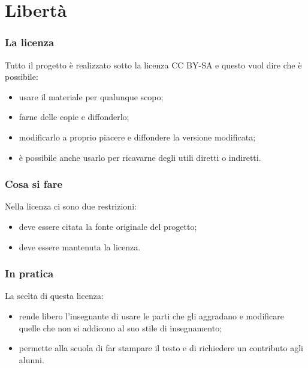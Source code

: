 \documentclass{beamer} %
\begin{document}
\section{Libertà}


\begin{frame}\frametitle{La licenza}

Tutto il progetto è realizzato sotto la licenza CC BY-SA e questo vuol dire 
che è possibile:
\begin{itemize} [<+->]
\item usare il materiale per qualunque scopo;
\item farne delle copie e diffonderlo;
\item modificarlo a proprio piacere e diffondere la versione modificata;
\item è possibile anche usarlo per ricavarne degli utili diretti o indiretti.
\end{itemize}

\end{frame}


\begin{frame}\frametitle{Cosa si  fare}

Nella licenza ci sono due restrizioni:

\bigskip
\begin{itemize} [<+->]
\item deve essere citata la fonte originale del progetto;
\item deve essere mantenuta la licenza.
\end{itemize}

\end{frame}


\begin{frame}\frametitle{In pratica}

La scelta di questa licenza:

\bigskip
\begin{itemize} [<+->]
\item rende libero l'insegnante di usare le parti che 
gli aggradano e modificare quelle che non si addicono al suo stile di 
insegnamento;
\item permette alla scuola di far stampare il testo e di richiedere un 
contributo agli alunni.
\end{itemize}

\end{frame}
\end{document}
